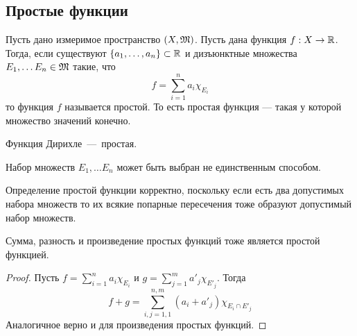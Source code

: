 \subsection{Простые функции}

\begin{definition}
    Пусть дано измеримое пространство $(X, \mathfrak{M})$. Пусть дана функция $f: X \rightarrow \mathbb{R}$. Тогда, если существуют $\{a_1, \ldots, a_n\} \subset \mathbb{R}$ и дизъюнктные множества $E_1, \ldots E_n \in \mathfrak{M}$ такие, что \[
        f = \sum\limits_{i = 1}^n a_i\chi_{E_i}
    \]
    то функция $f$ называется простой. То есть простая функция --- такая у которой множество значений конечно.
\end{definition}

\begin{example}
    Функция Дирихле~---~простая.
\end{example}

\begin{note}
    Набор множеств $E_1, \ldots E_n$ может быть выбран не единственным способом.
\end{note}

\begin{note}
    Определение простой функции корректно, поскольку если есть два допустимых набора множеств то их всякие попарные пересечения тоже образуют допустимый набор множеств.
\end{note}

\begin{lemma}
    Сумма, разность и произведение простых функций тоже является простой функцией.
\end{lemma}
\begin{proof}
    Пусть $f = \sum\limits_{i = 1}^{n} a_i\chi_{E_i}$ и $g = \sum\limits_{j = 1}^{m} a'_j\chi_{E'_j}$. Тогда \[f + g = \sum\limits_{i, j = 1, 1}^{n, m} (a_i + a'_j)\chi_{E_i \cap E'_j}\]
    Аналогичное верно и для произведения простых функций.
\end{proof}

